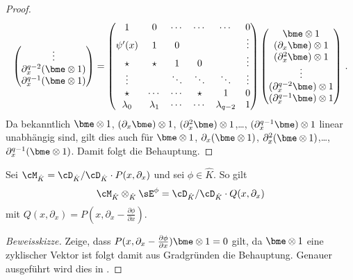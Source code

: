 \begin{proof}
\[\begin{pmatrix}
\vdots\\
\partial_x^{q-2}(\bme\otimes 1)\\
\partial_x^{q-1}(\bme\otimes 1)\\
\end{pmatrix}
=
\begin{pmatrix}
1         & 0         & \cdots & \cdots & \cdots        & 0 \\
\psi'(x)  & 1         & 0      &        &               & \vdots\\
\star     & \star     & 1      & 0      &               & \vdots\\
\vdots    &           & \ddots & \ddots & \ddots        & \vdots\\
\star     & \cdots    & \cdots & \star  & 1             & 0\\
\lambda_0 & \lambda_1 & \cdots & \cdots & \lambda_{q-2} & 1\\
\end{pmatrix}
\begin{pmatrix}
\bme\otimes 1\\
(\partial_x \bme)\otimes 1\\
(\partial_x^{2}\bme)\otimes 1\\
\vdots\\
(\partial_x^{q-2}\bme)\otimes 1\\
(\partial_x^{q-1}\bme)\otimes 1\\
\end{pmatrix}
\,.
\]
Da bekanntlich $\bme\otimes1$, $(\partial_x \bme)\otimes 1$,
$(\partial_x^{2}\bme)\otimes 1$,\dots, $(\partial_x^{q-1}\bme)\otimes 1$ linear
unabhängig sind, gilt dies auch für $\bme\otimes 1$, $\partial_x(\bme\otimes
1)$, $\partial_x^2(\bme\otimes 1)$,\dots, $\partial_x^{q-1}(\bme\otimes 1)$.
Damit folgt die Behauptung.
\end{proof}
\begin{lem} \label{lem:twistRechenregel}
Sei $\cM_{\hat K}=\cD_{\hat K}/\cD_{\hat K}\cdot P(x,\partial_x)$ und sei
$\phi\in \hat K$. So gilt
\[
\cM_{\hat K}\otimes_{\hat K}\sE^{\phi}=\cD_{\hat K}/\cD_{\hat K}\cdot
Q(x,\partial_x)
\]
mit $Q(x,\partial_x)=P(x,\partial_x-\frac{\partial \phi}{\partial x})$.
\end{lem}
\begin{proof}[Beweisskizze]
Zeige, dass $P(x,\partial_x-\frac{\partial \phi}{\partial x})\bme\otimes1=0$
gilt, da $\bme\otimes1$ eine zyklischer Vektor ist folgt damit aus Gradgründen
die Behauptung. Genauer ausgeführt wird dies in \cite[Seiten 39 bis
44]{DiplHedwig}.
\begin{comment}
\begin{align*}
P(x,\partial_x-\frac{\partial \phi}{\partial x})\bme\otimes1
 &=TODO
\end{align*}
\end{comment}
\end{proof}
